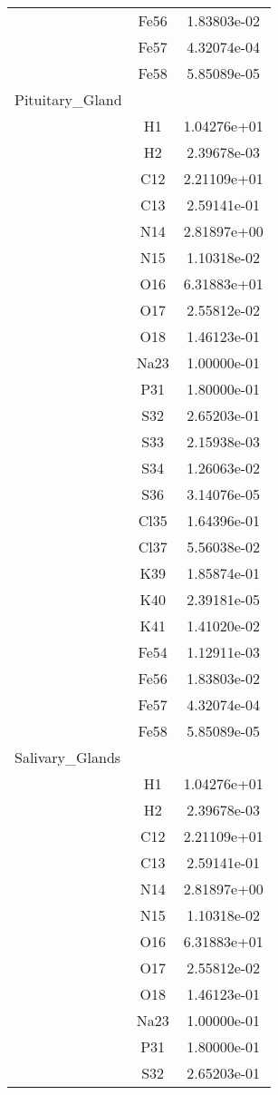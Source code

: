 \begin{centering}
\begin{longtable}{l c c}
& Fe56 & 1.83803e-02 \\ 
& Fe57 & 4.32074e-04 \\ 
& Fe58 & 5.85089e-05 \\ 
\hline
Pituitary_Gland & & \\
\hline
& H1 & 1.04276e+01 \\ 
& H2 & 2.39678e-03 \\ 
& C12 & 2.21109e+01 \\ 
& C13 & 2.59141e-01 \\ 
& N14 & 2.81897e+00 \\ 
& N15 & 1.10318e-02 \\ 
& O16 & 6.31883e+01 \\ 
& O17 & 2.55812e-02 \\ 
& O18 & 1.46123e-01 \\ 
& Na23 & 1.00000e-01 \\ 
& P31 & 1.80000e-01 \\ 
& S32 & 2.65203e-01 \\ 
& S33 & 2.15938e-03 \\ 
& S34 & 1.26063e-02 \\ 
& S36 & 3.14076e-05 \\ 
& Cl35 & 1.64396e-01 \\ 
& Cl37 & 5.56038e-02 \\ 
& K39 & 1.85874e-01 \\ 
& K40 & 2.39181e-05 \\ 
& K41 & 1.41020e-02 \\ 
& Fe54 & 1.12911e-03 \\ 
& Fe56 & 1.83803e-02 \\ 
& Fe57 & 4.32074e-04 \\ 
& Fe58 & 5.85089e-05 \\ 
\hline
Salivary_Glands & & \\
\hline
& H1 & 1.04276e+01 \\ 
& H2 & 2.39678e-03 \\ 
& C12 & 2.21109e+01 \\ 
& C13 & 2.59141e-01 \\ 
& N14 & 2.81897e+00 \\ 
& N15 & 1.10318e-02 \\ 
& O16 & 6.31883e+01 \\ 
& O17 & 2.55812e-02 \\ 
& O18 & 1.46123e-01 \\ 
& Na23 & 1.00000e-01 \\ 
& P31 & 1.80000e-01 \\ 
& S32 & 2.65203e-01 \\ 

\end{longtable}
\end{centering}
